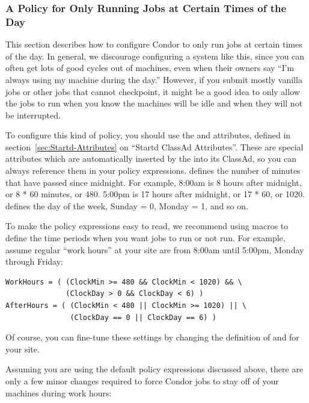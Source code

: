 \subsubsection{\label{sec:Time-Of-Day-Policy}
A Policy for Only Running Jobs at Certain Times of the Day}


This section describes how to configure Condor to only run jobs at
certain times of the day.
In general, we discourage configuring a system like this, since you
can often get lots of good cycles out of machines, even when their
owners say ``I'm always using my machine during the day.''
However, if you submit mostly vanilla jobs or other jobs that cannot
checkpoint, it might be a good idea to only allow the jobs to run when
you know the machines will be idle and when they will not be
interrupted.

To configure this kind of policy, you should use the 
and  attributes, defined in
section~\ref{sec:Startd-Attributes} on ``Startd ClassAd Attributes''.
These are special attributes which are automatically inserted by the
 into its ClassAd, so you can always reference them in
your policy expressions.
 defines the number of minutes that have passed since
midnight.  
For example, 8:00am is 8 hours after midnight, or 8 * 60 minutes, or
480.
5:00pm is 17 hours after midnight, or 17 * 60, or 1020.
 defines the day of the week, Sunday = 0, Monday = 1,
and so on.  

To make the policy expressions easy to read, we recommend using macros
to define the time periods when you want jobs to run or not run.  
For example, assume regular ``work hours'' at your site are from
8:00am until 5:00pm, Monday through Friday: 

\begin{verbatim}
WorkHours = ( (ClockMin >= 480 && ClockMin < 1020) && \
              (ClockDay > 0 && ClockDay < 6) ) 
AfterHours = ( (ClockMin < 480 || ClockMin >= 1020) || \
               (ClockDay == 0 || ClockDay == 6) )
\end{verbatim}

Of course, you can fine-tune these settings by changing the definition
of  and  for your site.

Assuming you are using the default policy expressions discussed above,
there are only a few minor changes required to force Condor jobs to
stay off of your machines during work hours:

